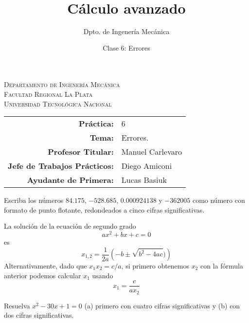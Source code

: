 \documentclass[11pt]{article}
\title{Cálculo avanzado}
\author{Dpto. de Ingenería Mecánica}
\date{Clase 6: Errores}
\begin{document}

\begin{center}
\end{center} 

\begin{center}
\vspace{\baselineskip}
\Large{\textsc{Departamento de Ingenería Mecánica}} \\
\textsc{Facultad Regional La Plata} \\
\textsc{Universidad Tecnológica Nacional}
\end{center}


\begin{center}
\begin{tabular}{r l}
    \textbf{Práctica:} & 6 \\
 \textbf{Tema:} & Errores. \\
 \textbf{Profesor Titular:} & Manuel Carlevaro \\
 \textbf{Jefe de Trabajos Prácticos:} & Diego Amiconi \\
 \textbf{Ayudante de Primera:} & Lucas Basiuk 
\end{tabular}\end{center}

\vspace{1em}

\begin{question} %
    Escriba los números $84.175$, $-528.685$, $0.000924138$ y $-362005$ como número con formato de punto flotante, redondeados a cinco cifras significativas.
\end{question}

\begin{question}  %
La solución de la ecuación de segundo grado
\[ a x^2 + b x + c = 0 \]
es
\[ x_{1,2} = \frac{1}{2a} \left( -b \pm \sqrt{b^2 - 4 a c}) \right) \]
Alternativamente, dado que $x_1 x_2 = c/a$, si primero obtenemos $x_2$ con la fórmula anterior podemos calcular $x_1$ usando
\[ x_1 = \frac{c}{a x_2} \]

Resuelva $x^2 - 30 x + 1 = 0$ (a) primero con cuatro cifras significativas y (b) con dos cifras significativas.
\end{question}
\end{document}
